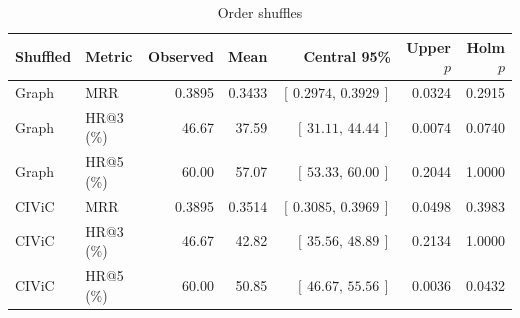 \begin{table}[t]
\centering
\caption{Order shuffles}
\label{tab:order-ablation}
\small
\setlength{\tabcolsep}{2.2pt}
\begin{tabular}{llrrrrr}
\toprule
Shuffled & Metric & Observed & Mean & Central 95\% & Upper $p$ & Holm $p$ \\
\midrule
Graph & MRR & 0.3895 & 0.3433 & $[\,0.2974,\,0.3929\,]$ & 0.0324 & 0.2915 \\
Graph & HR@3 (\%) & 46.67 & 37.59 & $[\,31.11,\,44.44\,]$ & 0.0074 & 0.0740 \\
Graph & HR@5 (\%) & 60.00 & 57.07 & $[\,53.33,\,60.00\,]$ & 0.2044 & 1.0000 \\
CIViC & MRR & 0.3895 & 0.3514 & $[\,0.3085,\,0.3969\,]$ & 0.0498 & 0.3983 \\
CIViC & HR@3 (\%) & 46.67 & 42.82 & $[\,35.56,\,48.89\,]$ & 0.2134 & 1.0000 \\
CIViC & HR@5 (\%) & 60.00 & 50.85 & $[\,46.67,\,55.56\,]$ & 0.0036 & 0.0432 \\
\bottomrule
\end{tabular}
\end{table}

